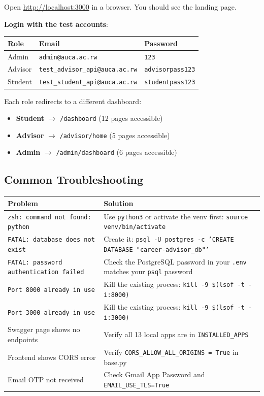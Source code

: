 \documentclass[12pt, a4paper]{article}
\begin{document}
Open \url{http://localhost:3000} in a browser. You should see the landing page.

\textbf{Login with the test accounts}:

\begin{longtable}{p{3cm}p{5.5cm}p{3cm}}
\toprule
\textbf{Role} & \textbf{Email} & \textbf{Password} \\
\midrule
Admin & \texttt{admin@auca.ac.rw} & \texttt{123} \\
Advisor & \texttt{test\_advisor\_api@auca.ac.rw} & \texttt{advisorpass123} \\
Student & \texttt{test\_student\_api@auca.ac.rw} & \texttt{studentpass123} \\
\bottomrule
\end{longtable}

Each role redirects to a different dashboard:
\begin{itemize}
    \item \textbf{Student} $\rightarrow$ \texttt{/dashboard} (12 pages accessible)
    \item \textbf{Advisor} $\rightarrow$ \texttt{/advisor/home} (5 pages accessible)
    \item \textbf{Admin} $\rightarrow$ \texttt{/admin/dashboard} (6 pages accessible)
\end{itemize}

\subsection{Common Troubleshooting}

\begin{longtable}{p{5cm}p{9cm}}
\toprule
\textbf{Problem} & \textbf{Solution} \\
\midrule
\endhead
\texttt{zsh: command not found: python} & Use \texttt{python3} or activate the venv first: \texttt{source venv/bin/activate} \\
\texttt{FATAL: database does not exist} & Create it: \texttt{psql -U postgres -c 'CREATE DATABASE "career-advisor\_db"'} \\
\texttt{FATAL: password authentication failed} & Check the PostgreSQL password in your \texttt{.env} matches your \texttt{psql} password \\
\texttt{Port 8000 already in use} & Kill the existing process: \texttt{kill -9 \$(lsof -t -i:8000)} \\
\texttt{Port 3000 already in use} & Kill the existing process: \texttt{kill -9 \$(lsof -t -i:3000)} \\
Swagger page shows no endpoints & Verify all 13 local apps are in \texttt{INSTALLED\_APPS} \\
Frontend shows CORS error & Verify \texttt{CORS\_ALLOW\_ALL\_ORIGINS = True} in base.py \\
Email OTP not received & Check Gmail App Password and \texttt{EMAIL\_USE\_TLS=True} \\
\bottomrule
\end{longtable}
\end{document}
